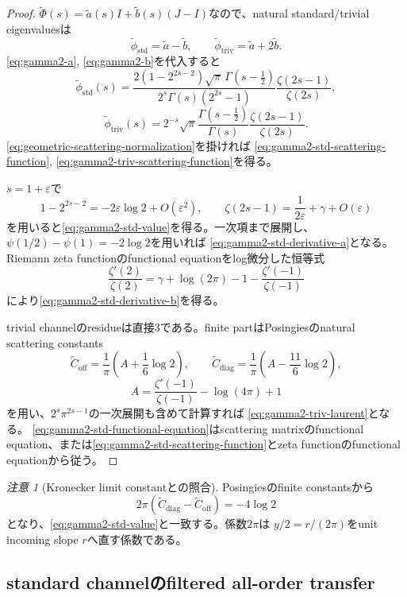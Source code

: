 \documentclass[11pt,a4paper]{ltjsarticle}
\theoremstyle{definition}
\theoremstyle{remark}
\newtheorem{remark}[theorem]{注意}
\newcommand{\eps}{\varepsilon}
\begin{document}
\begin{proof}
$\widetilde\Phi(s)=\widetilde a(s)I+\widetilde b(s)(J-I)$なので、natural standard/trivial eigenvaluesは
\[
 \widetilde\phi_{\mathrm{std}}=\widetilde a-\widetilde b,
 \qquad
 \widetilde\phi_{\mathrm{triv}}=\widetilde a+2\widetilde b.
\]
\eqref{eq:gamma2-a}, \eqref{eq:gamma2-b}を代入すると
\[
 \widetilde\phi_{\mathrm{std}}(s)
 =\frac{2(1-2^{2s-2})\sqrt\pi\,\Gamma(s-\frac12)}
 {2^s\Gamma(s)(2^{2s}-1)}
 \frac{\zeta(2s-1)}{\zeta(2s)},
\]
\[
 \widetilde\phi_{\mathrm{triv}}(s)
 =2^{-s}\sqrt\pi
 \frac{\Gamma(s-\frac12)}{\Gamma(s)}
 \frac{\zeta(2s-1)}{\zeta(2s)}.
\]
\eqref{eq:geometric-scattering-normalization}を掛ければ
\eqref{eq:gamma2-std-scattering-function},
\eqref{eq:gamma2-triv-scattering-function}を得る。

$s=1+\eps$で
\[
 1-2^{2s-2}=-2\eps\log2+O(\eps^2),
 \qquad
 \zeta(2s-1)=\frac1{2\eps}+\gamma+O(\eps)
\]
を用いると\eqref{eq:gamma2-std-value}を得る。一次項まで展開し、
$\psi(1/2)-\psi(1)=-2\log2$を用いれば
\eqref{eq:gamma2-std-derivative-a}となる。Riemann zeta functionのfunctional equationをlog微分した恒等式
\[
 \frac{\zeta'(2)}{\zeta(2)}
 =\gamma+\log(2\pi)-1
  -\frac{\zeta'(-1)}{\zeta(-1)}
\]
により\eqref{eq:gamma2-std-derivative-b}を得る。

trivial channelのresidueは直接$3$である。finite partはPosingiesのnatural scattering constants
\[
 \widetilde C_{\mathrm{off}}
 =\frac1\pi\left(A+\frac16\log2\right),
 \qquad
 \widetilde C_{\mathrm{diag}}
 =\frac1\pi\left(A-\frac{11}{6}\log2\right),
\]
\[
 A=\frac{\zeta'(-1)}{\zeta(-1)}-\log(4\pi)+1
\]
を用い、$2^s\pi^{2s-1}$の一次展開も含めて計算すれば
\eqref{eq:gamma2-triv-laurent}となる。
\eqref{eq:gamma2-std-functional-equation}はscattering matrixのfunctional equation、または\eqref{eq:gamma2-std-scattering-function}とzeta functionのfunctional equationから従う。
\end{proof}

\begin{remark}[Kronecker limit constantとの照合]
Posingiesのfinite constantsから
\[
 2\pi(\widetilde C_{\mathrm{diag}}
       -\widetilde C_{\mathrm{off}})
 =-4\log2
\]
となり、\eqref{eq:gamma2-std-value}と一致する。係数$2\pi$は
$y/2=r/(2\pi)$をunit incoming slope $r$へ直す係数である。
\end{remark}

\subsection{standard channelのfiltered all-order transfer}
\end{document}

